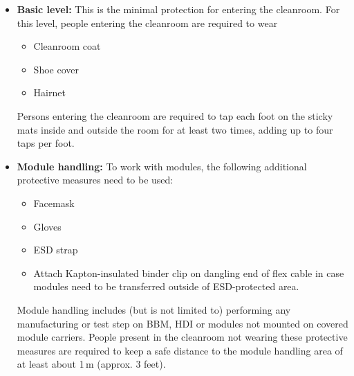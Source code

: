 \documentclass[12pt]{unlsilabsop}
\begin{document}
\begin{itemize}
    \item \textbf{Basic level:} This is the minimal protection for entering the cleanroom. For this level, people entering the cleanroom are required to wear
    \begin{itemize}
	\item Cleanroom coat
	\item Shoe cover
	\item Hairnet
    \end{itemize}
    Persons entering the cleanroom are required to tap each foot on the sticky mats inside and outside the room for at least two times, adding up to four taps per foot.
    \item \textbf{Module handling:} To work with modules, the following additional protective measures need to be used:
    \begin{itemize}
	\item Facemask
	\item Gloves
	\item ESD strap
    \item Attach Kapton-insulated binder clip on dangling end of flex cable in case modules need to be transferred outside of ESD-protected area.
    \end{itemize}
    Module handling includes (but is not limited to) performing any manufacturing or test step on BBM, HDI or modules not mounted on covered module carriers. People present in the cleanroom not wearing these protective measures are required to keep a safe distance to the module handling area of at least about 1\,m (approx. 3 feet).
\end{itemize}
\end{document}
